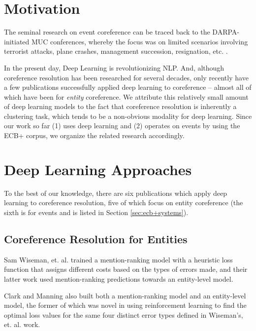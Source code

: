 \section{Motivation}
The seminal research on event coreference can be traced back to the DARPA-initiated MUC conferences, whereby the focus was on limited scenarios involving terrorist attacks, plane crashes, management succession, resignation, etc. \cite{Humphreys:1997:ECI:1598819.1598830,Bagga:1999:CEC:1608810.1608812}.

In the present day, Deep Learning is revolutionizing NLP.  And, although coreference resolution has been researched for several decades, only recently have a few publications successfully applied deep learning to coreference -- almost all of which have been for \textit{entity} coreference.  We attribute this relatively small amount of deep learning models to the fact that coreference resolution is inherently a clustering task, which tends to be a non-obvious modality for deep learning.  Since our work so far (1) uses deep learning and (2) operates on events by using the ECB+ corpus, we organize the related research accordingly.

\section{Deep Learning Approaches}
To the best of our knowledge, there are six publications which apply deep learning to coreference resolution, five of which focus on entity coreference (the sixth is for events and is listed in Section \ref{sec:ecb+systems}).

\subsection{Coreference Resolution for Entities}
Sam Wiseman, et. al. \cite{DBLP:conf/acl/WisemanRSW15,DBLP:conf/naacl/WisemanRS16} trained a mention-ranking model with a heuristic loss function that assigns different costs based on the types of errors made, and their latter work used mention-ranking predictions towards an entity-level model.

Clark and Manning \cite{clark2016improving,DBLP:journals/corr/ClarkM16a} also built both a mention-ranking model and an entity-level model, the former of which was novel in using reinforcement learning to find the optimal loss values for the same four distinct error types defined in Wiseman's, et. al. \cite{DBLP:conf/acl/WisemanRSW15} work.

